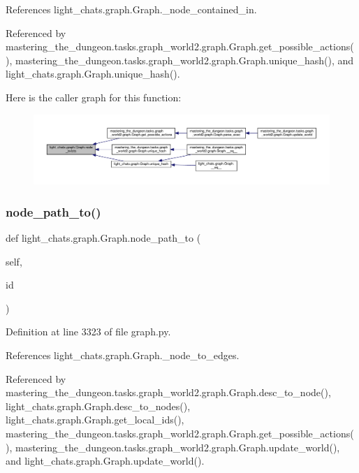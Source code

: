 References light\+\_\+chats.\+graph.\+Graph.\+\_\+node\+\_\+contained\+\_\+in.



Referenced by mastering\+\_\+the\+\_\+dungeon.\+tasks.\+graph\+\_\+world2.\+graph.\+Graph.\+get\+\_\+possible\+\_\+actions(), mastering\+\_\+the\+\_\+dungeon.\+tasks.\+graph\+\_\+world2.\+graph.\+Graph.\+unique\+\_\+hash(), and light\+\_\+chats.\+graph.\+Graph.\+unique\+\_\+hash().

Here is the caller graph for this function\+:
\nopagebreak
\begin{figure}[H]
\begin{center}
\leavevmode
\includegraphics[width=350pt]{classlight__chats_1_1graph_1_1Graph_ab0dd6685d8eb353d76eca8de20a39914_icgraph}
\end{center}
\end{figure}
\mbox{\label{classlight__chats_1_1graph_1_1Graph_a20da62a3d5411d93fe820accdd06fa33}} 
\subsubsection{\texorpdfstring{node\+\_\+path\+\_\+to()}{node\_path\_to()}}
{\footnotesize\ttfamily def light\+\_\+chats.\+graph.\+Graph.\+node\+\_\+path\+\_\+to (\begin{DoxyParamCaption}\item[{}]{self,  }\item[{}]{id }\end{DoxyParamCaption})}



Definition at line 3323 of file graph.\+py.



References light\+\_\+chats.\+graph.\+Graph.\+\_\+node\+\_\+to\+\_\+edges.



Referenced by mastering\+\_\+the\+\_\+dungeon.\+tasks.\+graph\+\_\+world2.\+graph.\+Graph.\+desc\+\_\+to\+\_\+node(), light\+\_\+chats.\+graph.\+Graph.\+desc\+\_\+to\+\_\+nodes(), light\+\_\+chats.\+graph.\+Graph.\+get\+\_\+local\+\_\+ids(), mastering\+\_\+the\+\_\+dungeon.\+tasks.\+graph\+\_\+world2.\+graph.\+Graph.\+get\+\_\+possible\+\_\+actions(), mastering\+\_\+the\+\_\+dungeon.\+tasks.\+graph\+\_\+world2.\+graph.\+Graph.\+update\+\_\+world(), and light\+\_\+chats.\+graph.\+Graph.\+update\+\_\+world().

